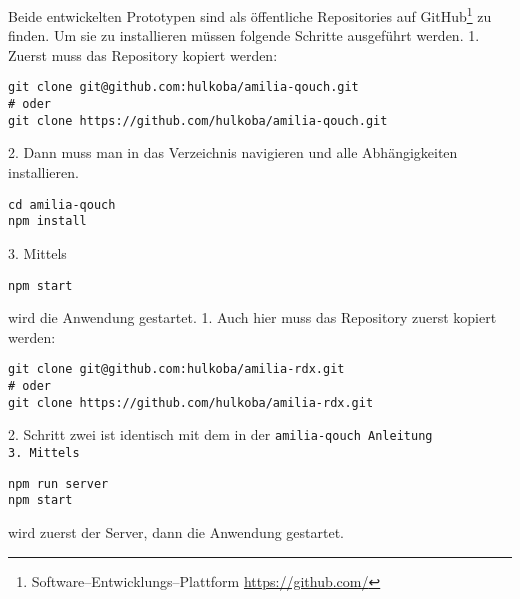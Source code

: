 Beide entwickelten Prototypen sind als öffentliche Repositories auf GitHub\footnote{Software--Entwicklungs--Plattform \url{https://github.com/}} zu finden. 
Um sie zu installieren müssen folgende Schritte ausgeführt werden.
1. Zuerst muss das Repository kopiert werden:
\begin{lstlisting}
git clone git@github.com:hulkoba/amilia-qouch.git
# oder
git clone https://github.com/hulkoba/amilia-qouch.git
\end{lstlisting}
2. Dann muss man in das Verzeichnis navigieren und alle Abhängigkeiten installieren.
\begin{lstlisting}
cd amilia-qouch
npm install
\end{lstlisting}
3. Mittels
\begin{lstlisting}
npm start
\end{lstlisting}
wird die Anwendung gestartet.
%
1. Auch hier muss das Repository zuerst kopiert werden:
\begin{lstlisting}
git clone git@github.com:hulkoba/amilia-rdx.git
# oder
git clone https://github.com/hulkoba/amilia-rdx.git
\end{lstlisting}
2. Schritt zwei ist identisch mit dem in der \tt{amilia-qouch} Anleitung\\
3. Mittels
\begin{lstlisting}
npm run server
npm start
\end{lstlisting}
wird zuerst der Server, dann die Anwendung gestartet.